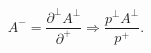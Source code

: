 \begin{equation}
A^-=\frac{\partial^{\perp}A^{\perp}}{\partial^+}\Rightarrow
\frac{p^{\perp}A^{\perp}}{p^+}.
\end{equation}

